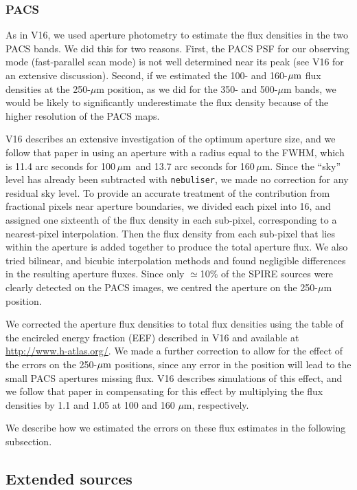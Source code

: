 \documentclass[a4paper,fleqn,usenatbib, twocolumn]{aastex61}
\def\mic{\,$\mu $m}
\begin{document}
\subsubsection{PACS}

As in V16, we used aperture photometry to estimate the flux densities
in the two PACS bands. We did this for two reasons. First, the PACS
PSF for our observing mode (fast-parallel scan mode) is not well
determined near its peak (see V16 for an extensive
discussion). Second, if we estimated the 100- and 160-$\mbox{$\mu$m}$ flux
densities at the 250-$\mu$m position, as we did for the 350- and
500-$\mu$m bands, we would be likely to significantly underestimate
the flux density because of the higher resolution of the PACS maps.

V16 describes an extensive investigation of the optimum aperture size,
and we follow that paper in using an aperture with a radius equal to
the FWHM, which is 11.4 arc seconds for 100\mic\ and 13.7 arc seconds
for 160\mic. Since the ``sky'' level has already been subtracted with
{\tt nebuliser}, we made no correction for any residual sky level.  To
provide an accurate treatment of the contribution from fractional
pixels near aperture boundaries, we divided each pixel into 16, and
assigned one sixteenth of the flux density in each sub-pixel,
corresponding to a nearest-pixel interpolation. Then the flux density
from each sub-pixel that lies within the aperture is added together to
produce the total aperture flux.  We also tried bilinear, and bicubic
interpolation methods and found negligible differences in the
resulting aperture fluxes.  Since only $\simeq$10\% of the SPIRE
sources were clearly detected on the PACS images, we centred the
aperture on the 250-$\mu$m position.

We corrected the aperture flux densities to total flux densities using
the table of the encircled energy fraction (EEF) described in V16 and
available at \url{http://www.h-atlas.org/}.  We made a further
correction to allow for the effect of the errors on the 250-$\mbox{$\mu$m}$
positions, since any error in the position will lead to the small PACS
apertures missing flux. V16 describes simulations of this effect, and
we follow that paper in compensating for this effect by multiplying
the flux densities by 1.1 and 1.05 at 100 and 160 $\mu$m,
respectively.

We describe how we estimated the errors on these flux estimates in the
following subsection.

\subsection{Extended sources} 
\end{document}
